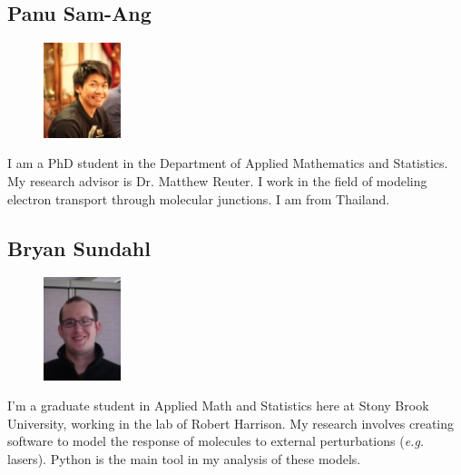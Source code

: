 \documentclass[]{article}
\begin{document}
\subsection*{Panu Sam-Ang} 
\begin{figure}
\begin{centering}
    \includegraphics[width=0.2\textwidth]{panu.jpg}
\end{centering}
\end{figure}
I am a PhD student in the Department of Applied Mathematics and Statistics. My research advisor is Dr. Matthew Reuter. I work in the field of modeling electron transport through molecular junctions. I am from Thailand.
\vspace{0.5 in}


\subsection*{Bryan Sundahl} 
\begin{figure}
\begin{centering}
    \includegraphics[width=0.2\textwidth]{bryan.jpg}
\end{centering}
\end{figure}
I'm a graduate student in Applied Math and Statistics here at Stony Brook University, working in the lab of Robert Harrison. My research involves creating software to model the response of molecules to external perturbations (\textit{e.g.} lasers).  Python is the main tool in my analysis of these models. 
\vspace{0.5 in}
\end{document}
